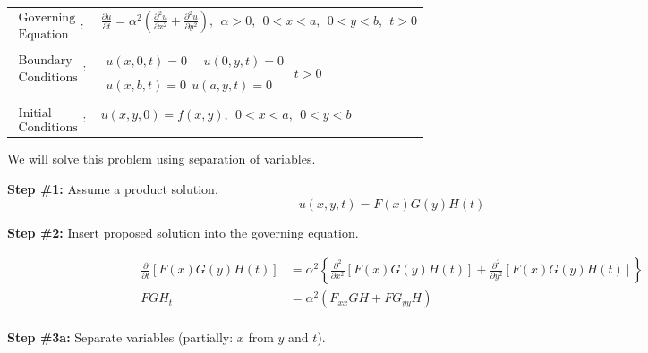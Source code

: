 \begin{table}
\begin{tabular}{l l}
$\substack{\text{Governing} \\\text{Equation}}: $& $\frac{\partial u}{\partial t} = \alpha^2 \left(\frac{\partial^2 u}{\partial x^2} + \frac{\partial^2 u}{\partial y^2}\right),  \ \ \alpha>0, \ \ 0<x<a, \ \ 0<y<b, \ \  t>0$ \\
& \\
$\substack{\text{Boundary} \\ \text{Conditions}}: $ & $\substack{u(x,0,t)=0  \ \ \ \ \ \ u(0,y,t) = 0 \\ \\ u(x,b,t) = 0 \ \ u(a,y,t) = 0} \ \ t>0$ \\
& \\
$\substack{\text{Initial} \\ \text{Conditions}}: $ & $u(x,y,0) = f(x,y), \ \ 0<x<a, \ \ 0<y<b $ 
\end{tabular}
\end{table}

\vspace{0.25cm}

\noindent We will solve this problem using separation of variables.

\vspace{0.25cm}

\noindent\textbf{Step \#1:} Assume a product solution.
\begin{equation*}
u(x,y,t) = F(x)G(y)H(t)
\end{equation*}

\vspace{0.25cm}

\noindent\textbf{Step \#2:} Insert proposed solution into the governing equation.

\begin{align*}
\frac{\partial}{\partial t}\left[F(x)G(y)H(t)\right] &= \alpha^2 \left\{\frac{\partial^2}{\partial x^2}\left[F(x)G(y)H(t)\right] + \frac{\partial^2}{\partial y^2}\left[F(x)G(y)H(t)\right] \right\} \\
FGH_t &= \alpha^2\left(F_{xx}GH + FG_{yy}H\right) \\
\end{align*}

\vspace{0.25cm}

\noindent\textbf{Step \#3a:} Separate variables (partially: $x$ from $y$ and $t$).

